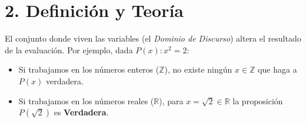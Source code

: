\documentclass[11pt]{article}
\newenvironment{teoria}{\section*{2. Definición y Teoría}}{}
\newenvironment{alerta}[1]{\begin{tcolorbox}[colback=yellow!5,colframe=yellow!75!black,title=Alerta: #1]}{\end{tcolorbox}}
\begin{document}
\begin{teoria}
  \begin{alerta}{El Dominio Importa al Evaluar}
    El conjunto donde viven las variables (el \textit{Dominio de Discurso}) altera el resultado de la evaluación. 
    Por ejemplo, dada $P(x) : x^2 = 2$:
    \begin{itemize}
      \item Si trabajamos en los números enteros ($\mathbb{Z}$), no existe ningún $x \in \mathbb{Z}$ que haga a $P(x)$ verdadera.
      \item Si trabajamos en los números reales ($\mathbb{R}$), para $x = \sqrt{2} \in \mathbb{R}$ la proposición $P(\sqrt{2})$ es \textbf{Verdadera}.
    \end{itemize}
  \end{alerta}
\end{teoria}
\end{document}
